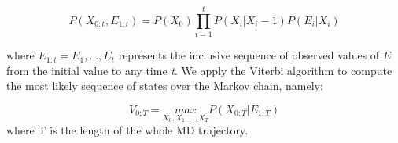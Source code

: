 \documentclass{article}
\begin{document}
$$
P(X_{0:t} , E_{1:t}) = P(X_0) \prod_{i=1}^t P(X_i|X_i - 1)P(E_i|X_i)
$$

where $E_{1:t}={E_1, ..., E_t}$ represents the inclusive sequence of observed values of $E$ from the initial value to any time \emph{t}. We apply the Viterbi algorithm to compute the most likely sequence of states over the Markov chain, namely:

$$
V_{0:T} = \underset{\text{$X_0, X_1, ..., X_T$}}{max} P(X_{0:T}|E_{1:T})
$$
where T is the length of the whole MD trajectory.

\printbibliography
\end{document}
